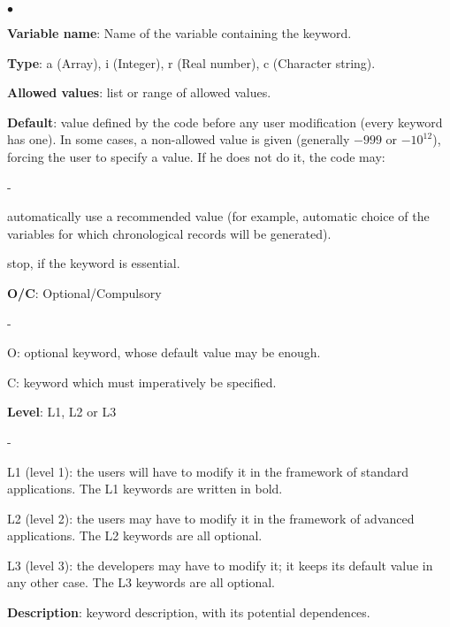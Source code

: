 \begin{list}{$\bullet$}{}
\item \textbf{Variable name}: Name of the variable containing the keyword.

\item \textbf{Type}: a (Array), i (Integer), r (Real number), c
      (Character string).

\item \textbf{Allowed values}: list or range of allowed values.

\item \textbf{Default}: value defined by the code before any user
      modification (every keyword has one). In some cases, a
      non-allowed value is given (generally $-999$ or $-10^{12}$), forcing the
      user to specify a value. If he does not do it, the code may:
\begin{list}{-}{}
\item automatically use a recommended value (for example, automatic
      choice of the variables for which chronological records will be
      generated).

\item stop, if the keyword is essential.
\end{list}

\item \textbf{O/C}: Optional/Compulsory
\begin{list}{-}{}
\item O: optional keyword, whose default value may be enough.

\item C: keyword which must imperatively be specified.
\end{list}

\item \textbf{Level}: L1, L2 or L3
\begin{list}{-}{}
\item L1 (level 1): the users will have to modify it in the framework of
      standard applications. The L1 keywords are written in bold.

\item L2 (level 2): the users may have to modify it in the framework of
      advanced applications. The L2 keywords are all optional.

\item L3 (level 3): the developers may have to modify it; it keeps its
      default value in any other case. The L3 keywords are all optional.
\end{list}

\item \textbf{Description}:  keyword description, with its potential
      dependences.

\end{list}

